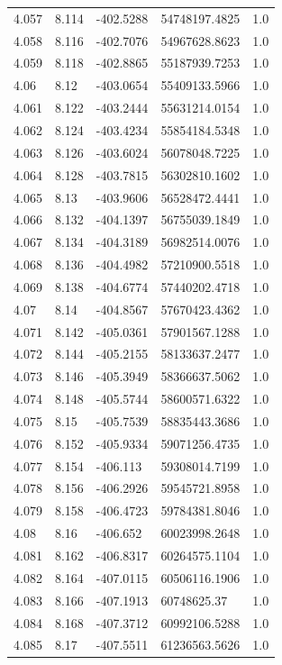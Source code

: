 \begin{tabular}{lllll}
4.057 & 8.114 & -402.5288 & 54748197.4825 & 1.0 \\
4.058 & 8.116 & -402.7076 & 54967628.8623 & 1.0 \\
4.059 & 8.118 & -402.8865 & 55187939.7253 & 1.0 \\
4.06 & 8.12 & -403.0654 & 55409133.5966 & 1.0 \\
4.061 & 8.122 & -403.2444 & 55631214.0154 & 1.0 \\
4.062 & 8.124 & -403.4234 & 55854184.5348 & 1.0 \\
4.063 & 8.126 & -403.6024 & 56078048.7225 & 1.0 \\
4.064 & 8.128 & -403.7815 & 56302810.1602 & 1.0 \\
4.065 & 8.13 & -403.9606 & 56528472.4441 & 1.0 \\
4.066 & 8.132 & -404.1397 & 56755039.1849 & 1.0 \\
4.067 & 8.134 & -404.3189 & 56982514.0076 & 1.0 \\
4.068 & 8.136 & -404.4982 & 57210900.5518 & 1.0 \\
4.069 & 8.138 & -404.6774 & 57440202.4718 & 1.0 \\
4.07 & 8.14 & -404.8567 & 57670423.4362 & 1.0 \\
4.071 & 8.142 & -405.0361 & 57901567.1288 & 1.0 \\
4.072 & 8.144 & -405.2155 & 58133637.2477 & 1.0 \\
4.073 & 8.146 & -405.3949 & 58366637.5062 & 1.0 \\
4.074 & 8.148 & -405.5744 & 58600571.6322 & 1.0 \\
4.075 & 8.15 & -405.7539 & 58835443.3686 & 1.0 \\
4.076 & 8.152 & -405.9334 & 59071256.4735 & 1.0 \\
4.077 & 8.154 & -406.113 & 59308014.7199 & 1.0 \\
4.078 & 8.156 & -406.2926 & 59545721.8958 & 1.0 \\
4.079 & 8.158 & -406.4723 & 59784381.8046 & 1.0 \\
4.08 & 8.16 & -406.652 & 60023998.2648 & 1.0 \\
4.081 & 8.162 & -406.8317 & 60264575.1104 & 1.0 \\
4.082 & 8.164 & -407.0115 & 60506116.1906 & 1.0 \\
4.083 & 8.166 & -407.1913 & 60748625.37 & 1.0 \\
4.084 & 8.168 & -407.3712 & 60992106.5288 & 1.0 \\
4.085 & 8.17 & -407.5511 & 61236563.5626 & 1.0 \\

\end{tabular}
